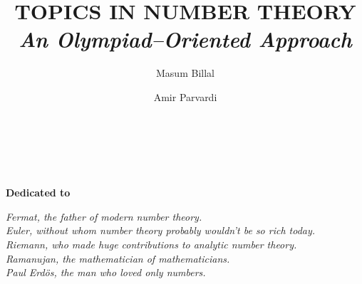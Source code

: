 \documentclass[leqno,12pt]{book}
\title{\bf\Huge TOPICS IN NUMBER THEORY\\ {\vspace*{.3in}\it\LARGE An Olympiad--Oriented Approach}\\\vspace*{.3in}{\Large Second Edition\\\vspace*{.1in}\rule{\textwidth}{0.8pt}}}
\author{
	\sc \Huge Masum Billal
	\and \sc \Huge Amir Parvardi\\\vspace*{.4in}
	\rule{\textwidth}{0.8pt}\\\vspace*{.2in}
}
\date{}
\begin{document}
\frontmatter
\pagestyle{empty}


\maketitle
\pagestyle{empty}

\begin{dedication}
	\begin{center}
		\textbf{Dedicated to}
	\end{center}\slshape
	Fermat, the father of modern number theory.\\
	Euler, without whom number theory probably wouldn't be so rich today.\\
	Riemann, who made huge contributions to analytic number theory.\\
	Ramanujan, the mathematician of mathematicians.\\
	Paul Erd\"{o}s, the man who loved only numbers.
\end{dedication}
\end{document}
